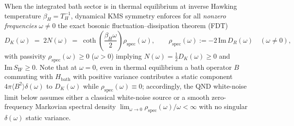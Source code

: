 \documentclass[11pt,a4paper]{article}
\theoremstyle{definition}
\theoremstyle{remark}
\newcommand{\1}{\mathbf{1}}
\begin{document}
When the integrated bath sector is in thermal equilibrium at inverse Hawking temperature $\beta_H = T_H^{-1}$, dynamical KMS symmetry \cite{CrossleyGloriosoLiu2017,GloriosoCrossleyLiu2017,LiuGlorioso2018} enforces for all \emph{nonzero frequencies} $\omega\neq 0$ the exact bosonic fluctuation--dissipation theorem (FDT)
\begin{equation}\label{eq:fdt}
  D_K(\omega) \;=\; 2 N(\omega) \;=\; \coth\!\left(\frac{\beta_H \omega}{2}\right)\rho_{\mathrm{spec}}(\omega), \qquad \rho_{\mathrm{spec}}(\omega) := -2\,\mathrm{Im}\,D_R(\omega) \quad (\omega \neq 0),
\end{equation}
with passivity $\rho_{\mathrm{spec}}(\omega) \ge 0$ ($\omega > 0$) implying $N(\omega) = \frac{1}{2}D_K(\omega) \ge 0$ and $\mathrm{Im}\,S_{\mathrm{IF}} \ge 0$. Note that at $\omega = 0$, even in thermal equilibrium a bath operator $B$ commuting with $H_{\mathrm{bath}}$ with positive variance contributes a static component $4\pi\langle B^2\rangle\delta(\omega)$ to $D_K(\omega)$ while $\rho_{\mathrm{spec}}(\omega)\equiv 0$; accordingly, the QND white-noise limit below assumes either a classical white-noise source or a smooth zero-frequency Markovian spectral density $\lim_{\omega\to 0}\rho_{\mathrm{spec}}(\omega)/\omega < \infty$ with no singular $\delta(\omega)$ static variance.
\end{document}
